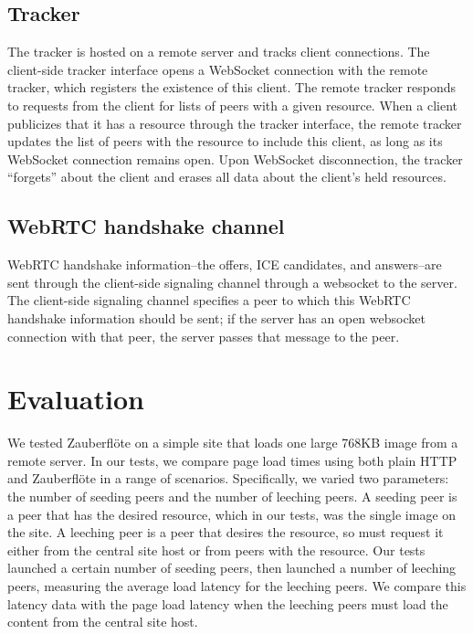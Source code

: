\documentclass[letterpaper,twocolumn,10pt]{article}
\newcommand{\zbf}{Zauberfl\"{o}te\xspace}
\begin{document}
\subsection{Tracker}
The tracker is hosted on a remote server and tracks client connections.
The client-side tracker interface opens a WebSocket connection with the remote tracker,
which registers the existence of this client. The remote tracker responds to
requests from the client for lists of peers with a given resource. When a client
publicizes that it has a resource through the tracker interface, the remote tracker updates
the list of peers with the resource to include this client, as
long as its WebSocket connection remains open. Upon WebSocket disconnection,
the tracker ``forgets'' about the client and erases all data about the client's
held resources.

\subsection{WebRTC handshake channel}

WebRTC handshake information--the offers, ICE candidates, and answers--are
sent through the client-side signaling channel through a websocket to
the server. The client-side signaling channel specifies a peer to which
this WebRTC handshake information should be sent; if the server has an open
websocket connection with that peer, the server passes that message to the peer.

\section{Evaluation}

We tested \zbf on a simple site that loads one large 768KB image from a remote server.
In our tests, we compare page load times using both plain HTTP and \zbf in a range of
scenarios. Specifically, we varied two parameters: the number of seeding peers and the
number of leeching peers. A seeding peer is a peer that has the desired resource, which
in our tests, was the single image on the site. A leeching peer is a peer that desires the
resource, so must request it either from the central site host or from peers with the resource.
Our tests launched a certain number of seeding peers, then launched a number of
leeching peers, measuring the average load latency for the leeching peers. We compare
this latency data with the page load latency when the leeching peers must load the content from the
central site host. 
\end{document}
